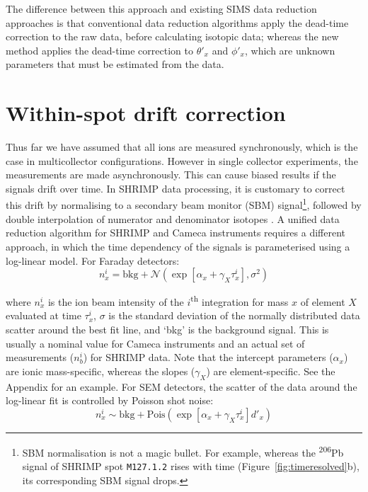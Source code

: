 \documentclass{article}
\begin{document}
The difference between this approach and existing SIMS data reduction
approaches is that conventional data reduction algorithms apply the
dead-time correction to the raw data, before calculating isotopic
data; whereas the new method applies the dead-time correction to
$\theta'_x$ and $\phi'_x$, which are unknown parameters that must be
estimated from the data.

\section{Within-spot drift correction}
\label{sec:drift}

Thus far we have assumed that all ions are measured synchronously,
which is the case in multicollector configurations. However in single
collector experiments, the measurements are made asynchronously. This
can cause biased results if the signals drift over time.  In SHRIMP
data processing, it is customary to correct this drift by normalising
to a secondary beam monitor (SBM) signal\footnote{SBM normalisation is
not a magic bullet. For example, whereas the \textsuperscript{206}Pb
signal of SHRIMP spot \texttt{M127.1.2} rises with time
(Figure~\ref{fig:timeresolved}b), its corresponding SBM signal
drops.}, followed by double interpolation of numerator and denominator
isotopes \citep{bodorkos2020, dodson1978}. A unified data reduction
algorithm for SHRIMP and Cameca instruments requires a different
approach, in which the time dependency of the signals is parameterised
using a log-linear model.  For Faraday detectors:
\begin{equation}
  n_x^i = \mbox{bkg} + \mathcal{N}(\exp[\alpha_x+\gamma_{X}\tau_x^i],\sigma^2)
  \label{eq:FARdrift}
\end{equation}

\noindent where $n_x^i$ is the ion beam intensity of the
$i$\textsuperscript{th} integration for mass $x$ of element $X$
evaluated at time $\tau_x^i$, $\sigma$ is the standard deviation of
the normally distributed data scatter around the best fit line, and
`bkg' is the background signal. This is usually a nominal value for
Cameca instruments and an actual set of measurements ($n_b^i$) for
SHRIMP data.  Note that the intercept parameters ($\alpha_x$) are
ionic mass-specific, whereas the slopes ($\gamma_X$) are
element-specific. See the Appendix for an example. For SEM detectors,
the scatter of the data around the log-linear fit is controlled by
Poisson shot noise:
\begin{equation}
  n_x^i \sim \mbox{bkg} +
  \mbox{Pois}\!\left(\exp[\alpha_x+\gamma_{X}\tau_x^i]d'_x\right)
  \label{eq:SEMdrift}
\end{equation}
\end{document}
